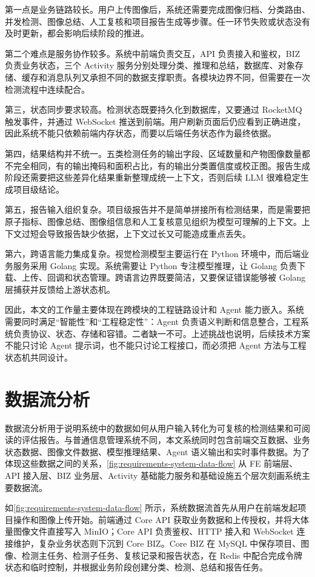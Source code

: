 第一点是业务链路较长。用户上传图像后，系统还需要完成图像归档、分类路由、并发检测、图像总结、人工复核和项目报告生成等步骤。任一环节失败或状态没有及时更新，都会影响后续阶段的推进。

第二个难点是服务协作较多。系统中前端负责交互，API 负责接入和鉴权，BIZ 负责业务状态，三个 Activity 服务分别处理分类、推理和总结，数据库、对象存储、缓存和消息队列又承担不同的数据支撑职责。各模块边界不同，但需要在一次检测流程中连续配合。

第三，状态同步要求较高。检测状态既要持久化到数据库，又要通过 RocketMQ 触发事件，并通过 WebSocket 推送到前端。用户刷新页面后仍应看到正确进度，因此系统不能只依赖前端内存状态，而要以后端任务状态作为最终依据。

第四，结果结构并不统一。五类检测任务的输出字段、区域数量和产物图像数量都不完全相同，有的输出掩码和面积占比，有的输出分类置信度或校正图。报告生成阶段还需要把这些差异化结果重新整理成统一上下文，否则后续 LLM 很难稳定生成项目级结论。

第五，报告输入组织复杂。项目级报告并不是简单拼接所有检测结果，而是需要把原子指标、图像总结、图像组信息和人工复核意见组织为模型可理解的上下文。上下文过短会导致报告缺少依据，上下文过长又可能造成重点丢失。

第六，跨语言能力集成复杂。视觉检测模型主要运行在 Python 环境中，而后端业务服务采用 Golang 实现。系统需要让 Python 专注模型推理，让 Golang 负责下载、上传、回调和状态管理。跨语言边界既要简洁，又要保证错误能够被 Golang 层捕获并反馈给上游状态机。

因此，本文的工作量主要体现在跨模块的工程链路设计和 Agent 能力嵌入。系统需要同时满足“智能性”和“工程稳定性”：Agent 负责语义判断和信息整合，工程系统负责协议、状态、存储和容错。二者缺一不可。上述挑战也说明，后续技术方案不能只讨论 Agent 提示词，也不能只讨论工程接口，而必须把 Agent 方法与工程状态机共同设计。

\section{数据流分析}
\label{sec:requirements-data-flow-analysis}

数据流分析用于说明系统中的数据如何从用户输入转化为可复核的检测结果和可阅读的评估报告。与普通信息管理系统不同，本文系统同时包含前端交互数据、业务状态数据、图像文件数据、模型推理结果、Agent 语义输出和实时事件数据。为了体现这些数据之间的关系，\cref{fig:requirements-system-data-flow} 从 FE 前端层、API 接入层、BIZ 业务层、Activity 基础能力服务和基础设施五个层次刻画系统主要数据流。

如\cref{fig:requirements-system-data-flow} 所示，系统数据流首先从用户在前端发起项目操作和图像上传开始。前端通过 Core API 获取业务数据和上传授权，并将大体量图像文件直接写入 MinIO；Core API 负责鉴权、HTTP 接入和 WebSocket 连接维护，复杂业务状态则下沉到 Core BIZ。Core BIZ 在 MySQL 中保存项目、图像、检测主任务、检测子任务、复核记录和报告状态，在 Redis 中配合完成令牌状态和临时控制，并根据业务阶段创建分类、检测、总结和报告任务。

